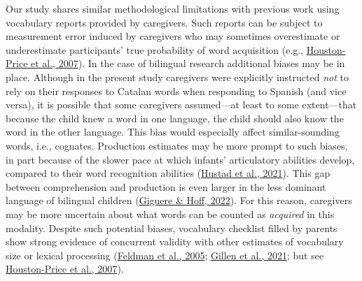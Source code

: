 \documentclass[
]{article}
\begin{document}
Our study shares similar methodological limitations with previous work
using vocabulary reports provided by caregivers. Such reports can be
subject to measurement error induced by caregivers who may sometimes
overestimate or underestimate participants' true probability of word
acquisition (e.g.,
\protect\hyperlink{ref-houston-price2007discrepancy}{Houston-Price et
al., 2007}). In the case of bilingual research additional biases may be
in place. Although in the present study caregivers were explicitly
instructed \emph{not} to rely on their responses to Catalan words when
responding to Spanish (and vice versa), it is possible that some
caregivers assumed---at least to some extent---that because the child
knew a word in one language, the child should also know the word in the
other language. This bias would especially affect similar-sounding
words, i.e., cognates. Production estimates may be more prompt to such
biases, in part because of the slower pace at which infants'
articulatory abilities develop, compared to their word recognition
abilities (\protect\hyperlink{ref-hustad2021speech}{Hustad et al.,
2021}). This gap between comprehension and production is even larger in
the less dominant language of bilingual children
(\protect\hyperlink{ref-giguere2022bilingual}{Giguere \& Hoff, 2022}).
For this reason, caregivers may be more uncertain about what words can
be counted as \emph{acquired} in this modality. Despite such potential
biases, vocabulary checklist filled by parents show strong evidence of
concurrent validity with other estimates of vocabulary size or lexical
processing (\protect\hyperlink{ref-feldman2005concurrent}{Feldman et
al., 2005}; \protect\hyperlink{ref-gillen2021tapping}{Gillen et al.,
2021}; but see
\protect\hyperlink{ref-houston-price2007discrepancy}{Houston-Price et
al., 2007}).
\end{document}

